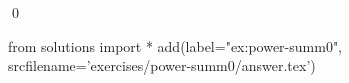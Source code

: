 
\begin{ex} 
  \label{ex:power-summ0}
  
  \qed
\end{ex} 
\begin{python0}
from solutions import *
add(label="ex:power-summ0",
    srcfilename='exercises/power-summ0/answer.tex') 
\end{python0}
